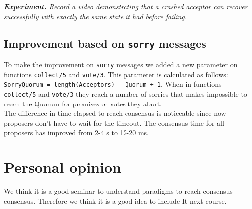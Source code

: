 \documentclass[a4paper, 10pt]{article}
\begin{document}
{\setlength{\parskip}{10pt}\noindent\textit{\textbf{Experiment.} Record a video demonstrating that a crashed acceptor can recover successfully with exactly the same state it had before failing.}}

\subsection{Improvement based on \texttt{sorry} messages}

To make the improvement on \texttt{sorry} messages we added a new parameter on functions \texttt{collect/5} and \texttt{vote/3}. This parameter is calculated as follows: \texttt{SorryQuorum = length(Acceptors) - Quorum + 1}. When in functions \texttt{collect/5} and \texttt{vote/3} they reach a number of sorries that makes impossible to reach the Quorum for promises or votes they abort.\\

\noindent The difference in time elapsed to reach consensus is noticeable since now proposers don't have to wait for the timeout. The consensus time for all proposers has improved from 2-4 s to 12-20 ms.

\section{Personal opinion}

We think it is a good seminar to understand paradigms to reach consensus consensus. Therefore we think it is a good idea to include It next course.
\end{document}
